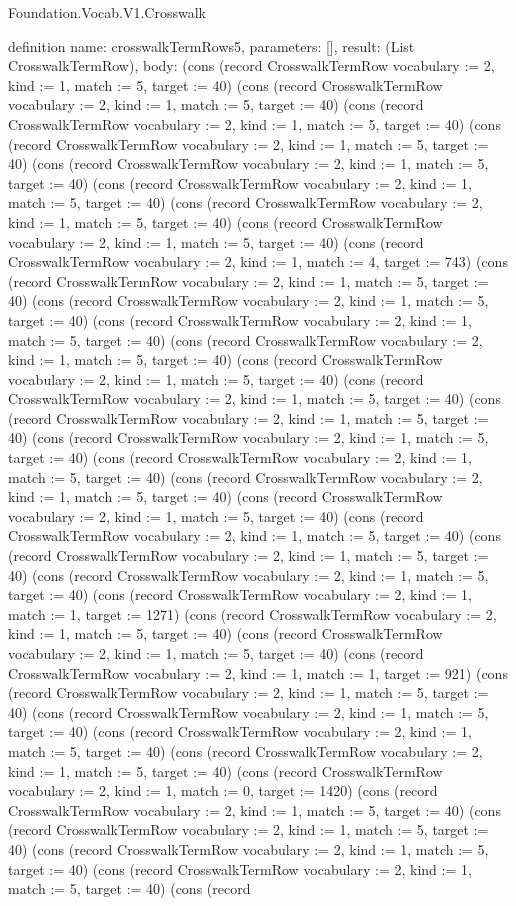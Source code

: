 \begin{lexlean}{Foundation.Vocab.V1.Crosswalk}
\begin{semanticmodule}
definition{
  name: crosswalkTermRows5,
  parameters: [],
  result: (List CrosswalkTermRow),
  body: (cons (record CrosswalkTermRow {vocabulary := 2, kind := 1, match := 5, target := 40}) (cons (record CrosswalkTermRow {vocabulary := 2, kind := 1, match := 5, target := 40}) (cons (record CrosswalkTermRow {vocabulary := 2, kind := 1, match := 5, target := 40}) (cons (record CrosswalkTermRow {vocabulary := 2, kind := 1, match := 5, target := 40}) (cons (record CrosswalkTermRow {vocabulary := 2, kind := 1, match := 5, target := 40}) (cons (record CrosswalkTermRow {vocabulary := 2, kind := 1, match := 5, target := 40}) (cons (record CrosswalkTermRow {vocabulary := 2, kind := 1, match := 5, target := 40}) (cons (record CrosswalkTermRow {vocabulary := 2, kind := 1, match := 5, target := 40}) (cons (record CrosswalkTermRow {vocabulary := 2, kind := 1, match := 4, target := 743}) (cons (record CrosswalkTermRow {vocabulary := 2, kind := 1, match := 5, target := 40}) (cons (record CrosswalkTermRow {vocabulary := 2, kind := 1, match := 5, target := 40}) (cons (record CrosswalkTermRow {vocabulary := 2, kind := 1, match := 5, target := 40}) (cons (record CrosswalkTermRow {vocabulary := 2, kind := 1, match := 5, target := 40}) (cons (record CrosswalkTermRow {vocabulary := 2, kind := 1, match := 5, target := 40}) (cons (record CrosswalkTermRow {vocabulary := 2, kind := 1, match := 5, target := 40}) (cons (record CrosswalkTermRow {vocabulary := 2, kind := 1, match := 5, target := 40}) (cons (record CrosswalkTermRow {vocabulary := 2, kind := 1, match := 5, target := 40}) (cons (record CrosswalkTermRow {vocabulary := 2, kind := 1, match := 5, target := 40}) (cons (record CrosswalkTermRow {vocabulary := 2, kind := 1, match := 5, target := 40}) (cons (record CrosswalkTermRow {vocabulary := 2, kind := 1, match := 5, target := 40}) (cons (record CrosswalkTermRow {vocabulary := 2, kind := 1, match := 5, target := 40}) (cons (record CrosswalkTermRow {vocabulary := 2, kind := 1, match := 5, target := 40}) (cons (record CrosswalkTermRow {vocabulary := 2, kind := 1, match := 5, target := 40}) (cons (record CrosswalkTermRow {vocabulary := 2, kind := 1, match := 1, target := 1271}) (cons (record CrosswalkTermRow {vocabulary := 2, kind := 1, match := 5, target := 40}) (cons (record CrosswalkTermRow {vocabulary := 2, kind := 1, match := 5, target := 40}) (cons (record CrosswalkTermRow {vocabulary := 2, kind := 1, match := 1, target := 921}) (cons (record CrosswalkTermRow {vocabulary := 2, kind := 1, match := 5, target := 40}) (cons (record CrosswalkTermRow {vocabulary := 2, kind := 1, match := 5, target := 40}) (cons (record CrosswalkTermRow {vocabulary := 2, kind := 1, match := 5, target := 40}) (cons (record CrosswalkTermRow {vocabulary := 2, kind := 1, match := 5, target := 40}) (cons (record CrosswalkTermRow {vocabulary := 2, kind := 1, match := 0, target := 1420}) (cons (record CrosswalkTermRow {vocabulary := 2, kind := 1, match := 5, target := 40}) (cons (record CrosswalkTermRow {vocabulary := 2, kind := 1, match := 5, target := 40}) (cons (record CrosswalkTermRow {vocabulary := 2, kind := 1, match := 5, target := 40}) (cons (record CrosswalkTermRow {vocabulary := 2, kind := 1, match := 5, target := 40}) (cons (record }
\end{semanticmodule}
\end{lexlean}
